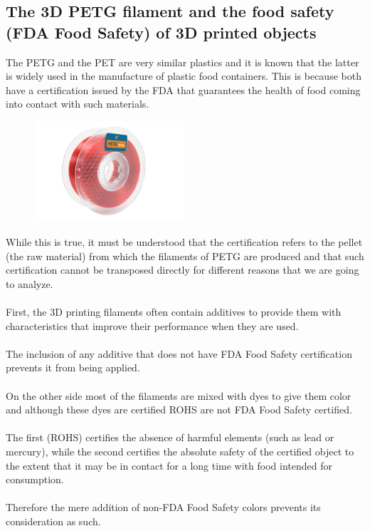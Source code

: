 \documentclass[11pt,a4paper]{article}
\begin{document}
	\subsection{The 3D PETG filament and the food safety (FDA Food Safety) of 3D printed objects}The PETG and the PET are very similar plastics and it is known that the latter is widely used in the manufacture of plastic food containers. This is because both have a certification issued by the FDA that guarantees the health of food coming into contact with such materials.
\begin{figure}[H]
\centering
\includegraphics[width=0.5\textwidth,cfbox=azul_marcos 1pt 0pt]{FOTOS/PETGKILOROJO}
\end{figure}
While this is true, it must be understood that the certification refers to the pellet (the raw material) from which the filaments of PETG are produced and that such certification cannot be transposed directly for different reasons that we are going to analyze.
\\\\
First, the 3D printing filaments often contain additives to provide them with characteristics that improve their performance when they are used.
\\\\
The inclusion of any additive that does not have FDA Food Safety certification prevents it from being applied.
\\\\
On the other side most of the filaments are mixed with dyes to give them color and although these dyes are certified ROHS are not FDA Food Safety certified.
\\\\
The first (ROHS) certifies the absence of harmful elements (such as lead or mercury), while the second certifies the absolute safety of the certified object to the extent that it may be in contact for a long time with food intended for consumption.
\\\\
Therefore the mere addition of non-FDA Food Safety colors prevents its consideration as such.
\end{document}
